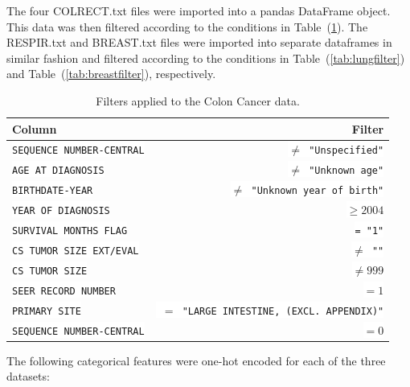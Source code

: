 \documentclass[a4paper,11pt]{article}
\newcommand{\codewhite}[1]{\colorbox{white}{\texttt{#1}}}
\begin{document}


 The four COLRECT.txt files were imported into a pandas DataFrame object.
This data was then filtered according to the conditions in Table~(\ref{tab:colonfilter}).
The RESPIR.txt and BREAST.txt files were imported into separate dataframes in similar fashion and filtered according
to the conditions in Table~(\ref{tab:lungfilter}) and Table~(\ref{tab:breastfilter}), respectively.







\begin{table}[tbp]
\begin{center}
\begin{tabular}{lr}
\toprule
 Column &  Filter \\
\midrule
\codewhite{SEQUENCE NUMBER-CENTRAL} & \codewhite{$\neq$ "Unspecified"} \\
\codewhite{AGE AT DIAGNOSIS} & \codewhite{$\neq$ "Unknown age"} \\
\codewhite{BIRTHDATE-YEAR} & \codewhite{$\neq$ "Unknown year of birth"} \\
\codewhite{YEAR OF DIAGNOSIS} & \codewhite{$\geq 2004$} \\
\codewhite{SURVIVAL MONTHS FLAG} & \codewhite{= "1"}\\
\codewhite{CS TUMOR SIZE EXT/EVAL} & \codewhite{$\neq$ ""} \\
\codewhite{CS TUMOR SIZE} & \codewhite{$\neq 999$} \\
\codewhite{SEER RECORD NUMBER} & \codewhite{$= 1$} \\
\codewhite{PRIMARY SITE} & \codewhite{ $=$ "LARGE INTESTINE, (EXCL. APPENDIX)"} \\
\codewhite{SEQUENCE NUMBER-CENTRAL} & \codewhite{$=0$} \\
\bottomrule
\end{tabular}
\caption{\label{tab:colonfilter} Filters applied to the Colon Cancer data.}
\end{center}
\end{table}






The following categorical features were one-hot encoded for each of the three datasets:
\end{document}
